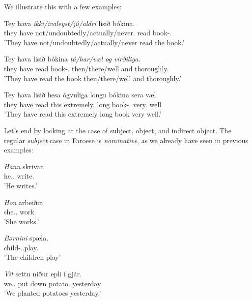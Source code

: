 \documentclass[12pt,%
    times,
]{lin-v2/lin}
\begin{document}
We illustrate this with a few examples:
\begin{exe}
    \ex
    \begin{xlist}
        \item \gll Tey hava \emph{ikki/ivaleyst/jú/aldri} lisið bókina.\\
        they have not/undoubtedly/actually/never.\Adv{} read book-\Det.\Acc\\
        \trans 'They have not/undoubtedly/actually/never read the book.'
        \item \gll Tey hava lisið bókina \emph{tá/har/væl og virðiliga}.\\
        they have read book-\Det.\Acc{} {then/there/well and thoroughly}.\Adv{}\\
        \trans 'They have read the book then/there/well and thoroughly.'
        \item \gll Tey hava lisið hesa ógvuliga longu bókina sera væl.\\
        they have read this extremely.\Adv{} long book-\Det.\Acc{} very.\Adv{} well\\
        \trans 'They have read this extremely long book very well.'
    \end{xlist}
\end{exe}

Let's end by looking at the case of subject, object, and indirect object. The regular \emph{subject} case in Faroese
is \emph{nominative}, as we already have seen in previous examples:
\begin{exe}
    \ex
    \begin{xlist}
        \item \gll \emph{Hann} skrivar.\\
        he.\Nom.\Sg{} write.\Third\Sg\\
        \trans 'He writes.'
        \item \gll \emph{Hon} arbeiðir.\\
        she.\Nom.\Sg{} work.\Third\Sg\\
        \trans 'She works.'
        \item \gll \emph{Børnini} spæla.\\
        child-\Det.\Nom.\Pl play.\Third\Pl\\
        \trans 'The children play'
        \item \gll \emph{Vit} settu niður epli {í gjár}.\\
        we.\Nom.\Pl{} put down potato.\Pl{} yesterday\\
        \trans 'We planted potatoes yesterday.'
    \end{xlist}
\end{exe}
\end{document}
